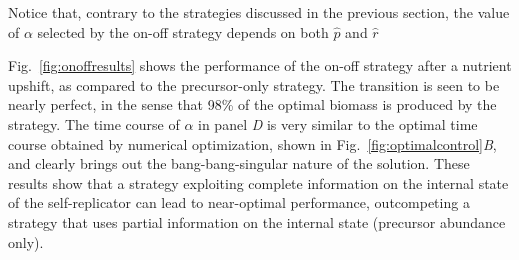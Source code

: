 Notice that, contrary to the strategies discussed in the previous section, the value of $\alpha$ selected by the on-off strategy depends on both $\hat{p}$ and $\hat{r}$ 

Fig.~\ref{fig:onoffresults} shows the performance of the on-off strategy after a nutrient upshift, as compared to the precursor-only strategy.
The transition is seen to be nearly perfect, in the sense that 98\% of the optimal biomass is produced by the strategy.
The time course of $\alpha$ in panel \textit{D} is very similar to the optimal time course obtained by numerical optimization, shown in Fig.~\ref{fig:optimalcontrol}\textit{B}, and clearly brings out the bang-bang-singular nature of the solution. 
These results show that a strategy exploiting complete information on the internal state of the self-replicator can lead to near-optimal performance, outcompeting a strategy that uses partial information on the internal state (precursor abundance only).

